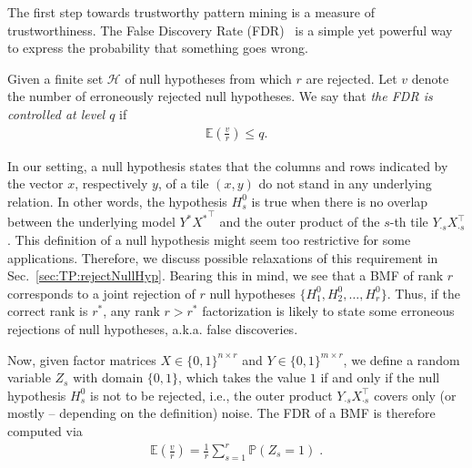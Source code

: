 The first step towards trustworthy pattern mining is a measure of trustworthiness. 
The False Discovery Rate (FDR)~\cite{benjamini1995controlling} is a simple yet powerful way to express the probability that something goes wrong.
\begin{definition}[FDR]
Given a finite set $\mathcal{H}$ of null hypotheses from which $r$ are rejected. Let $v$ denote the number of erroneously rejected null hypotheses. We say that \emph{the FDR is controlled at level $q$} if
\begin{align*}
\mathbb{E}\left(\frac{v}{r}\right)\leq q.
\end{align*}
\end{definition}
In our setting, a null hypothesis states that the columns and rows indicated by the vector $x$, respectively $y$, of a tile $(x,y)$ do not stand in any underlying relation. In other words, the hypothesis $H_s^0$ is true when there is no overlap between the underlying model $Y^*{X^*}^\top$ and the outer product of the $s$-th tile $Y_{\cdot s}X_{\cdot s}^\top$. This definition of a null hypothesis might seem too restrictive for some applications. Therefore, we discuss possible relaxations of this requirement in Sec.~\ref{sec:TP:rejectNullHyp}. 
Bearing this in mind, we see that a BMF of rank $r$ corresponds to a joint rejection of $r$ null hypotheses $\{H_1^0,H_2^0,\dots,H_r^0\}$. 
Thus, if the correct rank is $r^*$, any rank $r>r^*$ factorization is likely to state some erroneous rejections of null hypotheses, a.k.a. false discoveries. 

Now, given factor matrices $X\in \{0,1\}^{n\times r}$ and $Y\in\{0,1\}^{m\times r}$, we define a random variable $Z_s$ with domain $\{0,1\}$, which takes the value $1$ if and only if the null hypothesis $H_s^0$ is not to be rejected, i.e., the outer product $Y_{\cdot s}X_{\cdot s}^\top $ covers only (or mostly -- depending on the definition) noise. The FDR of a BMF is therefore computed via
\begin{align}
\mathbb{E}\left(\frac{v}{r}\right) = \frac{1}{r}\sum_{s=1}^r\mathbb{P}(Z_s=1)\;.\label{eq:FDRZ}
\end{align}

